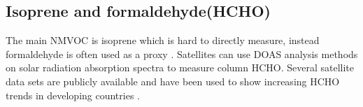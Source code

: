 \subsection{Isoprene and formaldehyde(HCHO)}

The main NMVOC is isoprene \cite{Guenther_2006} which is hard to directly measure, instead formaldehyde is often used as a proxy \cite{Marais_2012,bauwens2013satellite}. 
Satellites can use DOAS analysis methods on solar radiation absorption spectra to measure column HCHO.
Several satellite data sets are publicly available and have been used to show increasing HCHO trends in developing countries \cite{Mahajan_2015}.
  